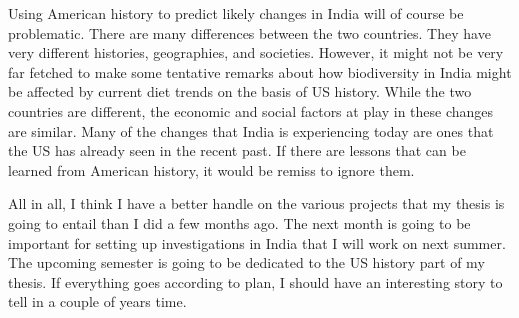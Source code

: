 \documentclass[report.tex]{subfiles}
\begin{document}
Using American history to predict likely changes in India will of course be problematic. There are many differences between the two countries. They have very different histories, geographies, and societies. However, it might not be very far fetched to make some tentative remarks about how biodiversity in India might be affected by current diet trends on the basis of US history. While the two countries are different, the economic and social factors at play in these changes are similar. Many of the changes that India is experiencing today are ones that the US has already seen in the recent past. If there are lessons that can be learned from American history, it would be remiss to ignore them.

All in all, I think I have a better handle on the various projects that my thesis is going to entail than I did a few months ago. The next month is going to be important for setting up investigations in India that I will work on next summer. The upcoming semester is going to be dedicated to the US history part of my thesis. If everything goes according to plan, I should have an interesting story to tell in a couple of years time.
\end{document}

